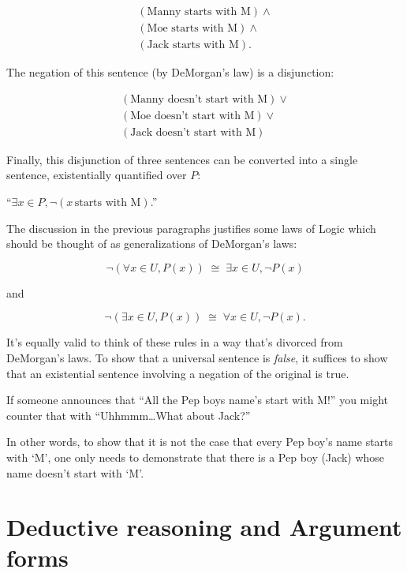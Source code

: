 \begin{gather*} (\mbox{Manny starts with M}) \land \\
(\mbox{Moe starts with M}) \land \\
(\mbox{Jack starts with M}).
\end{gather*}

\noindent  The negation
of this sentence (by DeMorgan's law) is a disjunction:

\begin{gather*}
(\mbox{Manny doesn't start with M}) \lor \\ 
(\mbox{Moe doesn't start with M}) \lor \\
(\mbox{Jack doesn't start with M})
\end{gather*}

\noindent Finally, this disjunction of three sentences can be converted into 
a single sentence, existentially quantified over $P$:

``$\exists x \in P, {\lnot}(x \, \mbox{starts with M})$.'' 

The discussion in the previous paragraphs justifies some laws of 
Logic which should be thought of as generalizations of DeMorgan's laws:

\[ 
{\lnot}( \forall x \in U, P(x)) \; \cong \; \exists x \in U, {\lnot}P(x)
\]

\noindent and

\[ 
{\lnot}( \exists x \in U, P(x)) \; \cong \; \forall x \in U, {\lnot}P(x).
\]

It's equally valid to think of these rules in a way that's divorced from
DeMorgan's laws.  To show that a universal sentence is {\em false}, it suffices
to show that an existential sentence involving a negation of the original is 
true.

If someone announces that ``All the Pep boys name's start with M!'' you might counter that
with ``Uhhmmm\ldots What about Jack?''

In other words, to show that it is not the case that every Pep boy's name starts
with `M', one only needs to demonstrate that there is a Pep boy (Jack) whose 
name doesn't start with `M'.

\clearpage





\newpage

\section{Deductive reasoning and Argument forms}
\label{sec:deduct}

